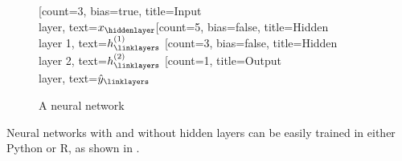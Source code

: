 \begin{figure}
  \centering
 \begin{neuralnetwork}[height=5]
        \newcommand{\x}[2]{$x_#2$}
        \newcommand{\y}[2]{$\hat{y}_#2$}
        \newcommand{\hfirst}[2]{\small $h^{(1)}_#2$}
        \newcommand{\hsecond}[2]{\small $h^{(2)}_#2$}
        [count=3, bias=true, title=Input\\layer, text=\x]
        \hiddenlayer[count=5, bias=false, title=Hidden\\layer 1, text=\hfirst] \linklayers
        \hiddenlayer[count=3, bias=false, title=Hidden\\layer 2, text=\hsecond] \linklayers
        \outputlayer[count=1, title=Output\\layer, text=\y] \linklayers
 \end{neuralnetwork}
\caption{A neural network \label{fig:hiddenlayers}}
\end{figure}

Neural networks with and without hidden layers can be easily trained in either Python or R,
as shown in .

